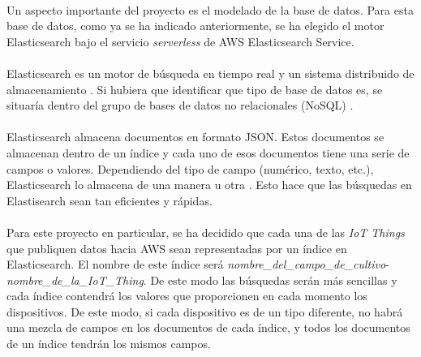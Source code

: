 \documentclass[../../memoria.tex]{subfiles}
\begin{document}
\paragraph{}
Un aspecto importante del proyecto es el modelado de la base de datos. Para esta base de datos, como ya se ha indicado anteriormente, se ha elegido el motor Elasticsearch bajo el servicio \textit{serverless} de AWS Elasticsearch Service.

\paragraph{}
Elasticsearch es un motor de búsqueda en tiempo real y un sistema distribuido de almacenamiento \cite{elastic}. Si hubiera que identificar que tipo de base de datos es, se situaría dentro del grupo de bases de datos no relacionales (NoSQL) \cite{nosql}.

\paragraph{}
Elasticsearch almacena documentos en formato JSON. Estos documentos se almacenan dentro de un índice y cada uno de esos documentos tiene una serie de campos o valores. Dependiendo del tipo de campo (numérico, texto, etc.), Elasticsearch lo almacena de una manera u otra \cite{elasticdata}. Esto hace que las búsquedas en Elastisearch sean tan eficientes y rápidas.

\paragraph{}
Para este proyecto en particular, se ha decidido que cada una de las \textit{IoT Things} que publiquen datos hacia AWS sean representadas por un índice en Elasticsearch. El nombre de este índice será \textit{nombre\_del\_campo\_de\_cultivo}-\textit{nombre\_de\_la\_IoT\_Thing}. De este modo las búsquedas serán más sencillas y cada índice contendrá los valores que proporcionen en cada momento los dispositivos. De este modo, si cada dispositivo es de un tipo diferente, no habrá una mezcla de campos en los documentos de cada índice, y todos los documentos de un índice tendrán los mismos campos.
\end{document}
